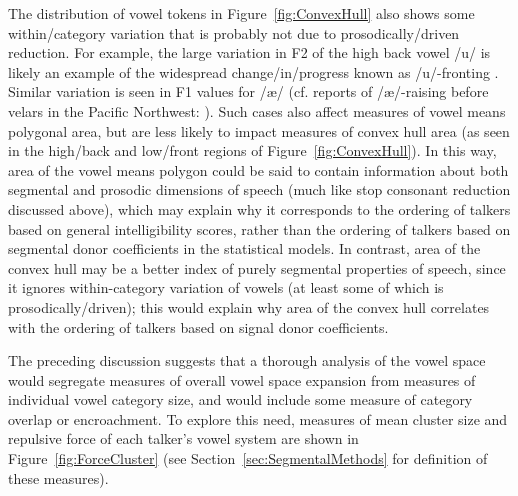 The distribution of vowel tokens in Figure~\ref{fig:ConvexHull} also shows some within\-/category variation that is probably not due to prosodically\-/driven reduction.  For example, the large variation in F2 of the high back vowel /u/ is likely an example of the widespread change\-/in\-/progress known as /u/-fronting \citep[chap.\ 12]{LabovEtAl2006}.  Similar variation is seen in F1 values for /æ/ (cf. reports of /æ/-raising before velars in the Pacific Northwest: \citealt{Reed1952, WassinkEtAl2009}).  Such cases also affect measures of vowel means polygonal area, but are less likely to impact measures of convex hull area (as seen in the high\-/back and low\-/front regions of Figure~\ref{fig:ConvexHull}).  In this way, area of the vowel means polygon could be said to contain information about both segmental and prosodic dimensions of speech (much like stop consonant reduction discussed above), which may explain why it corresponds to the ordering of talkers based on general intelligibility scores, rather than the ordering of talkers based on segmental donor coefficients in the statistical models.  In contrast, area of the convex hull may be a better index of purely segmental properties of speech, since it ignores within-category variation of vowels (at least some of which is prosodically\-/driven); this would explain why area of the convex hull correlates with the ordering of talkers based on signal donor coefficients.\footnotemark{}


The preceding discussion suggests that a thorough analysis of the vowel space would segregate measures of overall vowel space expansion from measures of individual vowel category size, and would include some measure of category overlap or encroachment.  To explore this need, measures of mean cluster size and repulsive force of each talker’s vowel system are shown in Figure~\ref{fig:ForceCluster} (see Section~\ref{sec:SegmentalMethods} for definition of these measures).

